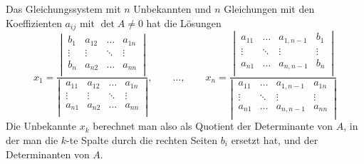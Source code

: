 \begin{satz}[Cramer]
Das Gleichungssystem mit $n$ Unbekannten und $n$ Gleichungen
mit den Koeffizienten $a_{ij}$ 
mit $\det A\ne 0$ hat die Lösungen
\[
x_1=\frac{
\left|\,\begin{matrix}
b_1&a_{12}&\dots&a_{1n}\\
\vdots&\vdots&\ddots&\vdots\\
b_n&a_{n2}&\dots&a_{nn}\\
\end{matrix}\,\right|
}{
\left|\,\begin{matrix}
a_{11}&a_{12}&\dots&a_{1n}\\
\vdots&\vdots&\ddots&\vdots\\
a_{n1}&a_{n2}&\dots&a_{nn}\\
\end{matrix}\,\right|
}
,\qquad\dots,\qquad
x_n=\frac{
\left|\,\begin{matrix}
a_{11}&\dots&a_{1,n-1}&b_1\\
\vdots&\ddots&\vdots&\vdots\\
a_{n1}&\dots&a_{n,n-1}&b_n\\
\end{matrix}\,\right|
}{
\left|\,\begin{matrix}
a_{11}&\dots&a_{1,n-1}&a_{1n}\\
\vdots&\ddots&\vdots&\vdots\\
a_{n1}&\dots&a_{n,n-1}&a_{nn}\\
\end{matrix}\,\right|
}
\]
Die Unbekannte $x_k$ berechnet man also als Quotient der Determinante
von $A$, in der man die $k$-te Spalte durch die rechten Seiten $b_i$
ersetzt hat, und der Determinanten von $A$.
\end{satz}

